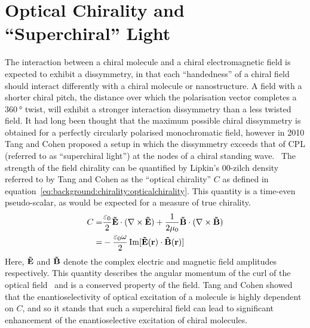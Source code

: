\section{Optical Chirality and ``Superchiral'' Light}\label{sec:background:Chirality:opticalchirality}
The interaction between a chiral molecule and a chiral electromagnetic field is expected to exhibit a dissymmetry, in that each ``handedness'' of a chiral field should interact differently with a chiral molecule or nanostructure. A field with a shorter chiral pitch, the distance over which the polarisation vector completes a $\SI{360}{\degree}$ twist, will exhibit a stronger interaction dissymmetry than a less twisted field. It had long been thought that the maximum possible chiral dissymmetry is obtained for a perfectly circularly polarised monochromatic field, however in 2010 Tang and Cohen proposed a setup in which the dissymmetry exceeds that of CPL (referred to as ``superchiral light'') at the nodes of a chiral standing wave.~\cite{Tang2010}
The strength of the field chirality can be quantified by Lipkin's 00-zilch density~\cite{Lipkin1964} referred to by Tang and Cohen as the ``optical chirality'' $C$ as defined in equation~\ref{eq:background:chirality:opticalchirality}. This quantity is a time-even pseudo-scalar, as would be expected for a measure of true chirality.
\begin{equation} \label{eq:background:chirality:opticalchirality}
    \begin{split}
        C = &\frac{\varepsilon_0 }{2}{\bf{\tilde E}} \cdot (\nabla  \times {\bf{\tilde E}}) + \frac{1}{{2\mu _0}}{\bf{\tilde B}} \cdot (\nabla  \times {\bf{\tilde B}}) \\
        = &- \frac{{{\varepsilon _0}\omega }}{2} \operatorname{Im}[ \bf{\tilde E}(\bf{r}) \cdot \bf{\tilde B}(\bf{r}) ]
    \end{split}
\end{equation}
Here, $\bf{\tilde E}$ and $\bf{\tilde B}$ denote the complex electric and magnetic field amplitudes respectively. This quantity describes the angular momentum of the curl of the optical field~\cite{Cameron2012a} and is a conserved property of the field. Tang and Cohen showed that the enantioselectivity of optical excitation of a molecule is highly dependent on $C$, and so it stands that such a superchiral field can lead to significant enhancement of the enantioselective excitation of chiral molecules.

